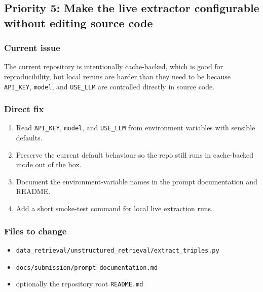 \documentclass[
  11pt,
  a4paper,
]{article}
\providecommand{\tightlist}{%
  \setlength{\itemsep}{0pt}\setlength{\parskip}{0pt}}
\begin{document}
\subsection{Priority 5: Make the live extractor configurable without
editing source
code}\label{priority-5-make-the-live-extractor-configurable-without-editing-source-code}

\subsubsection{Current issue}\label{current-issue-4}

The current repository is intentionally cache-backed, which is good for
reproducibility, but local reruns are harder than they need to be
because \texttt{API\_KEY}, \texttt{model}, and \texttt{USE\_LLM} are
controlled directly in source code.

\subsubsection{Direct fix}\label{direct-fix-4}

\begin{enumerate}
\def\labelenumi{\arabic{enumi}.}
\tightlist
\item
  Read \texttt{API\_KEY}, \texttt{model}, and \texttt{USE\_LLM} from
  environment variables with sensible defaults.
\item
  Preserve the current default behaviour so the repo still runs in
  cache-backed mode out of the box.
\item
  Document the environment-variable names in the prompt documentation
  and README.
\item
  Add a short smoke-test command for local live extraction runs.
\end{enumerate}

\subsubsection{Files to change}\label{files-to-change-4}

\begin{itemize}
\tightlist
\item
  \texttt{data\_retrieval/unstructured\_retrieval/extract\_triples.py}
\item
  \texttt{docs/submission/prompt-documentation.md}
\item
  optionally the repository root \texttt{README.md}
\end{itemize}
\end{document}
